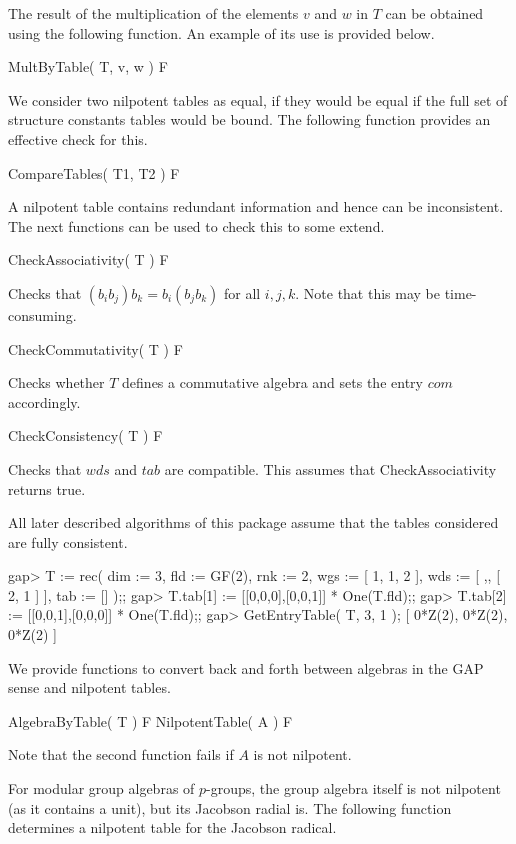 The result of the multiplication of the elements $v$ and $w$ in $T$
can be obtained using the following function. An example of its use is
provided below.

\> MultByTable( T, v, w ) F

We consider two nilpotent tables as equal, if they would be equal if
the full set of structure constants tables would be bound. The following
function provides an effective check for this.

\> CompareTables( T1, T2 ) F

A nilpotent table contains redundant information and hence can be 
inconsistent. The next functions can be used to check this to some
extend. 

\> CheckAssociativity( T ) F

Checks that $(b_i b_j) b_k = b_i (b_j b_k)$ for all $i,j,k$. Note that this
may be time-consuming.

\> CheckCommutativity( T ) F

Checks whether $T$ defines a commutative algebra and sets the entry $com$
accordingly.

\> CheckConsistency( T ) F

Checks that $wds$ and $tab$ are compatible. This assumes that 
CheckAssociativity returns true.

All later described algorithms of this package assume that the tables 
considered are fully consistent.

\beginexample
gap> T := rec( dim := 3, 
               fld := GF(2), 
               rnk := 2, 
               wgs := [ 1, 1, 2 ],
               wds := [ ,, [ 2, 1 ] ],
               tab := [] );;
gap> T.tab[1] := [[0,0,0],[0,0,1]] * One(T.fld);;
gap> T.tab[2] := [[0,0,1],[0,0,0]] * One(T.fld);;
gap> GetEntryTable( T, 3, 1 );
[ 0*Z(2), 0*Z(2), 0*Z(2) ]
\endexample


We provide functions to convert back and forth between algebras in the GAP
sense and nilpotent tables.

\> AlgebraByTable( T ) F
\> NilpotentTable( A ) F

Note that the second function fails if $A$ is not nilpotent.

For modular group algebras of $p$-groups, the group algebra itself is
not nilpotent (as it contains a unit), but its Jacobson radial is. The
following function determines a nilpotent table for the Jacobson radical.

